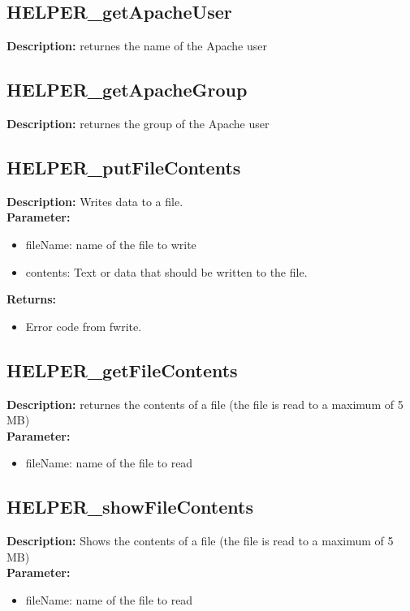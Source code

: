 \subsection{HELPER\_getApacheUser}
\textbf{Description:} returnes the name of the Apache user\\

\subsection{HELPER\_getApacheGroup}
\textbf{Description:} returnes the group of the Apache user\\

\subsection{HELPER\_putFileContents}
\textbf{Description:} Writes data to a file.\\
\textbf{Parameter:}
\begin{itemize}
\item fileName: name of the file to write
\item contents: Text or data that should be written to the file.
\end{itemize}
\textbf{Returns:}
\begin{itemize}
\item Error code from fwrite.
\end{itemize}

\subsection{HELPER\_getFileContents}
\textbf{Description:} returnes the contents of a file (the file is read to a maximum of 5 MB)\\
\textbf{Parameter:}
\begin{itemize}
\item fileName: name of the file to read
\end{itemize}

\subsection{HELPER\_showFileContents}
\textbf{Description:} Shows the contents of a file (the file is read to a maximum of 5 MB)\\
\textbf{Parameter:}
\begin{itemize}
\item fileName: name of the file to read
\end{itemize}


